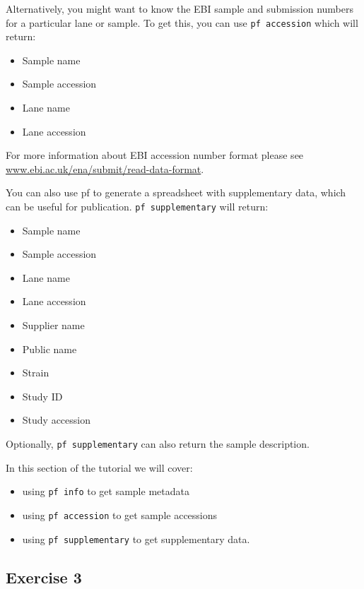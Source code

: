 \documentclass[11pt]{article}
\providecommand{\tightlist}{%
      \setlength{\itemsep}{0pt}\setlength{\parskip}{0pt}}
\begin{document}
Alternatively, you might want to know the EBI sample and submission
numbers for a particular lane or sample. To get this, you can use
\texttt{pf\ accession} which will return:

\begin{itemize}
\tightlist
\item
  Sample name
\item
  Sample accession
\item
  Lane name
\item
  Lane accession
\end{itemize}

For more information about EBI accession number format please see
\href{https://www.ebi.ac.uk/ena/submit/read-data-format\#accession_number_format}{www.ebi.ac.uk/ena/submit/read-data-format}.

You can also use pf to generate a spreadsheet with supplementary data,
which can be useful for publication. \texttt{pf\ supplementary} will
return:

\begin{itemize}
\tightlist
\item
  Sample name
\item
  Sample accession
\item
  Lane name
\item
  Lane accession
\item
  Supplier name
\item
  Public name
\item
  Strain
\item
  Study ID
\item
  Study accession
\end{itemize}

Optionally, \texttt{pf\ supplementary} can also return the sample
description.

In this section of the tutorial we will cover:

\begin{itemize}
\tightlist
\item
  using \texttt{pf\ info} to get sample metadata
\item
  using \texttt{pf\ accession} to get sample accessions
\item
  using \texttt{pf\ supplementary} to get supplementary data.
\end{itemize}

    \hypertarget{exercise-3}{%
\subsection{Exercise 3}\label{exercise-3}}
\end{document}
